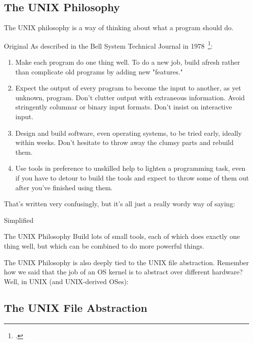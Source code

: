 \subsection{The UNIX Philosophy}

The UNIX philosophy is a way of thinking about what a program should do.

\begin{frame}{Original}
  As described in the Bell System Technical Journal in 1978~\footcite{mcilroy:unix}:
  {
    \small
    \begin{enumerate}
      \item
        Make each program do one thing well. To do a new job, build afresh rather
        than complicate old programs by adding new "features."
      \item
        Expect the output of every program to become the input to another, as yet
        unknown, program. Don't clutter output with extraneous information. Avoid
        stringently columnar or binary input formats. Don't insist on interactive
        input.
      \item
        Design and build software, even operating systems, to be tried early,
        ideally within weeks. Don't hesitate to throw away the clumsy parts and
        rebuild them.
      \item
        Use tools in preference to unskilled help to lighten a programming task,
        even if you have to detour to build the tools and expect to throw some of
        them out after you've finished using them.
    \end{enumerate}
  }
\end{frame}

That's written very confusingly, but it's all just a really wordy way of saying:

\begin{frame}[c]{Simplified}
  \begin{block}{The UNIX Philosophy}
    Build lots of small tools, each of which does exactly one thing well, but
    which can be combined to do more powerful things.
  \end{block}
\end{frame}

The UNIX Philosophy is also deeply tied to the UNIX file abstraction.  Remember
how we said that the job of an OS kernel is to abstract over different
hardware?  Well, in UNIX (and UNIX-derived OSes):

\subsection{The UNIX File Abstraction}

